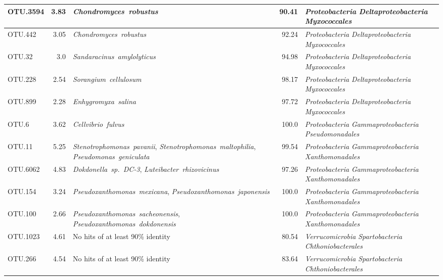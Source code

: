 \begin{longtable}{lrP{5cm}rP{7cm}}
OTU.3594 & 3.83 & \mbox{\textit{Chondromyces robustus}} & 90.41 & \mbox{\textit{Proteobacteria}} \mbox{\textit{Deltaproteobacteria}} \mbox{\textit{Myxococcales}} \\ \midrule
OTU.442 & 3.05 & \mbox{\textit{Chondromyces robustus}} & 92.24 & \mbox{\textit{Proteobacteria}} \mbox{\textit{Deltaproteobacteria}} \mbox{\textit{Myxococcales}} \\ \midrule
OTU.32 & 3.0 & \mbox{\textit{Sandaracinus amylolyticus}} & 94.98 & \mbox{\textit{Proteobacteria}} \mbox{\textit{Deltaproteobacteria}} \mbox{\textit{Myxococcales}} \\ \midrule
OTU.228 & 2.54 & \mbox{\textit{Sorangium cellulosum}} & 98.17 & \mbox{\textit{Proteobacteria}} \mbox{\textit{Deltaproteobacteria}} \mbox{\textit{Myxococcales}} \\ \midrule
OTU.899 & 2.28 & \mbox{\textit{Enhygromyxa salina}} & 97.72 & \mbox{\textit{Proteobacteria}} \mbox{\textit{Deltaproteobacteria}} \mbox{\textit{Myxococcales}} \\ \midrule
OTU.6 & 3.62 & \mbox{\textit{Cellvibrio fulvus}} & 100.0 & \mbox{\textit{Proteobacteria}} \mbox{\textit{Gammaproteobacteria}} \mbox{\textit{Pseudomonadales}} \\ \midrule
OTU.11 & 5.25 & \mbox{\textit{Stenotrophomonas pavanii}}, \mbox{\textit{Stenotrophomonas maltophilia}}, \mbox{\textit{Pseudomonas geniculata}} & 99.54 & \mbox{\textit{Proteobacteria}} \mbox{\textit{Gammaproteobacteria}} \mbox{\textit{Xanthomonadales}} \\ \midrule
OTU.6062 & 4.83 & \mbox{\textit{Dokdonella sp. DC-3}}, \mbox{\textit{Luteibacter rhizovicinus}} & 97.26 & \mbox{\textit{Proteobacteria}} \mbox{\textit{Gammaproteobacteria}} \mbox{\textit{Xanthomonadales}} \\ \midrule
OTU.154 & 3.24 & \mbox{\textit{Pseudoxanthomonas mexicana}}, \mbox{\textit{Pseudoxanthomonas japonensis}} & 100.0 & \mbox{\textit{Proteobacteria}} \mbox{\textit{Gammaproteobacteria}} \mbox{\textit{Xanthomonadales}} \\ \midrule
OTU.100 & 2.66 & \mbox{\textit{Pseudoxanthomonas sacheonensis}}, \mbox{\textit{Pseudoxanthomonas dokdonensis}} & 100.0 & \mbox{\textit{Proteobacteria}} \mbox{\textit{Gammaproteobacteria}} \mbox{\textit{Xanthomonadales}} \\ \midrule
OTU.1023 & 4.61 & {No hits of at least 90\% identity} & 80.54 & \mbox{\textit{Verrucomicrobia}} \mbox{\textit{Spartobacteria}} \mbox{\textit{Chthoniobacterales}} \\ \midrule
OTU.266 & 4.54 & {No hits of at least 90\% identity} & 83.64 & \mbox{\textit{Verrucomicrobia}} \mbox{\textit{Spartobacteria}} \mbox{\textit{Chthoniobacterales}} \\ \midrule

\end{longtable}
